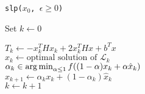 \begin{algorithm}[ht!]
\caption{\texttt{slp($x_0$, $\epsilon \ge 0$)}}
\label{alg:iter}
\SetAlgoVlined
\DontPrintSemicolon
Set $k \leftarrow 0$\;

 {
    $T_k \leftarrow - x_k^THx_k + 2x_k^THx + b^Tx$ \\
    $\hat{x}_k \leftarrow \textrm{optimal solution of } \mathcal{L}_k$ \\
    $\alpha_k \in \operatorname*{arg\,min}_{\alpha \leq 1} f((1-\alpha) x_k + \alpha \hat{x}_k)$ \\
    $x_{k+1} \leftarrow \alpha_k x_k + (1-\alpha_k)\hat{x}_k$ \\
    $k \leftarrow k +1$
}
\end{algorithm}
